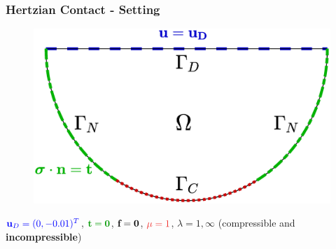 \documentclass[8pt, oneside]{beamer}   	%
\newcommand{\bff}{\textbf{f}}
\newcommand{\bt}{\textbf{t}}
\newcommand{\bu}{\textbf{u}}
\newcommand{\colb}{\color{blue}}
\newcommand{\colg}{\color{mygreen}}
\newcommand{\colo}{\color{orange}}
\newcommand{\colk}{\color{black}}
\newcommand{\titlecolor}[1]{\frametitle{\textcolor{dkgrey}{ \textbf{#1}}}}
\begin{document}
\begin{frame}
\titlecolor{Hertzian Contact - Setting}
\begin{figure}[htbp!]
\includegraphics[scale=0.25]{img/neuhertzpicC.eps} 
\end{figure}
$\colb \bu_D = (0,- 0.01)^T$, $\colg \bt = \textbf{0}$, 
$\colk \bff = \textbf{0}$, $\colo \mu = 1$, $ \lambda = 1, \infty$ (compressible and \textbf{incompressible})
\end{frame}

\end{document}
